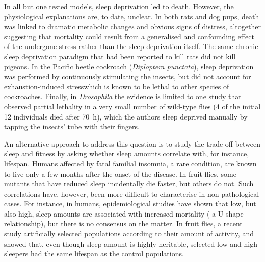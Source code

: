 In all but one tested models, sleep deprivation led to death.
However, the physiological explanations are, to date, unclear.
In both rats and dog pups, death was linked to dramatic metabolic changes and obvious signs of distress,
altogether suggesting that mortality could result from a generalised and confounding effect of the undergone stress rather than the sleep deprivation itself\cite{bentivoglio_pioneering_1997, rechtschaffen_sleep_1995}.
The same chronic sleep deprivation paradigm that had been reported to kill rats did not kill pigeons\cite{newman_sleep_2008}. 
In the Pacific beetle
cockroach (\emph{Diploptera punctata}), sleep deprivation was performed by continuously stimulating the insects\cite{stephenson_prolonged_2007}, but did not account for exhaustion-induced stress\emd{}which is known to be lethal to other species of cockroaches\cite{cook_neurophysiological_1974}.
Finally, in \emph{Drosophila} the evidence is limited to one study that observed partial lethality in a very small number of wild-type flies (4 of the initial 12 individuals died after 70~h),
which the authors sleep deprived manually by tapping the insects' tube with their fingers\cite{shaw_stress_2002}.

An alternative approach to address this question is to study the trade-off between sleep and fitness by asking whether sleep amounts correlate with, for instance, lifespan. 
Humans affected by fatal familial insomnia, a rare condition, are known to live only a few months after the onset of the disease\cite{schenkein_self_2006}.
In fruit flies, some mutants that have reduced sleep incidentally die faster\cite{cirelli_reduced_2005}, but others do not\cite{kume_dopamine_2005}.
Such correlations have, however, been more difficult to characterise in non-pathological cases.
For instance, in humans, epidemiological studies have shown that low, but also high, sleep amounts are associated with increased mortality (\ie{} a U-shape relationship)\cite{akerstedt_sleep_2017,akerstedt_sleep_2018}, but there is no consensus on the matter\cite{kurina_sleep_2013}.
In fruit flies, a recent study artificially selected populations according to their amount of activity, and showed that, even though sleep amount is highly heritable, selected low and high sleepers had the same lifespan as the control populations\cite{harbison_selection_2017}.

